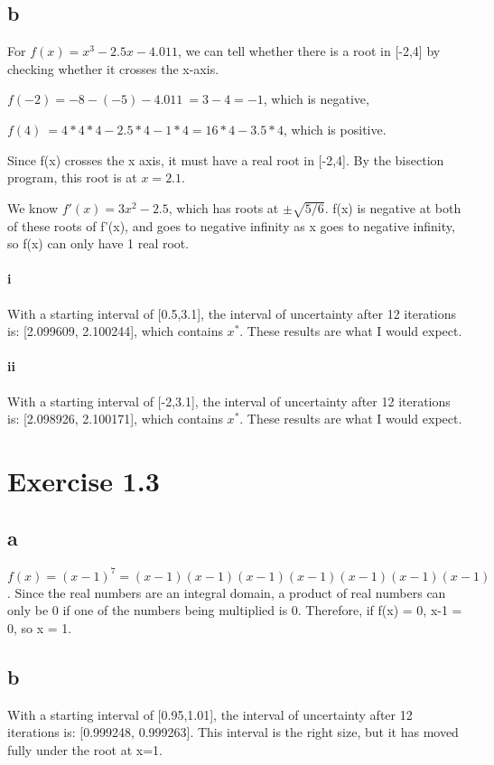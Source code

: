\documentclass[11pt]{amsart}
\begin{document}
\subsection{b}
For $f(x) = x^{3} - 2.5x - 4.011$, we can tell whether there is a root in [-2,4] by checking whether it crosses the x-axis. 

 $f(-2) = -8 - (-5) - 4.011 ~= 3-4 = -1$, which is negative,
 
 $f(4) ~= 4*4*4 - 2.5*4 - 1*4 = 16*4 - 3.5*4$, which is positive.
 
 Since f(x) crosses the x axis, it must have a real root in [-2,4].  By the bisection program, this root is at $x=2.1$.
 
 We know $f'(x) = 3x^{2} - 2.5$, which has roots at $\pm\sqrt{5/6}$.  f(x) is negative at both of these roots of f'(x), and goes to negative infinity as x goes to negative infinity, so f(x) can only have 1 real root.\\
 
 \paragraph{i}
 With a starting interval of [0.5,3.1], the interval of uncertainty after 12 iterations is: [2.099609, 2.100244], which contains $x^{*}$.  These results are what I would expect.\\
 
 \paragraph{ii}
  With a starting interval of [-2,3.1], the interval of uncertainty after 12 iterations is: [2.098926, 2.100171], which contains $x^{*}$.  These results are what I would expect.\\
 
 \section{Exercise 1.3}
 \subsection{a}
 $f(x) = (x-1)^{7} = (x-1)(x-1)(x-1)(x-1)(x-1)(x-1)(x-1)$.  Since the real numbers are an integral domain, a product of real numbers can only be 0 if one of the numbers being multiplied is 0.  Therefore, if f(x) = 0, x-1 = 0, so x = 1.
 \subsection{b}
    With a starting interval of [0.95,1.01], the interval of uncertainty after 12 iterations is: [0.999248, 0.999263].  This interval is the right size, but it has moved fully under the root at x=1.  
\end{document}

